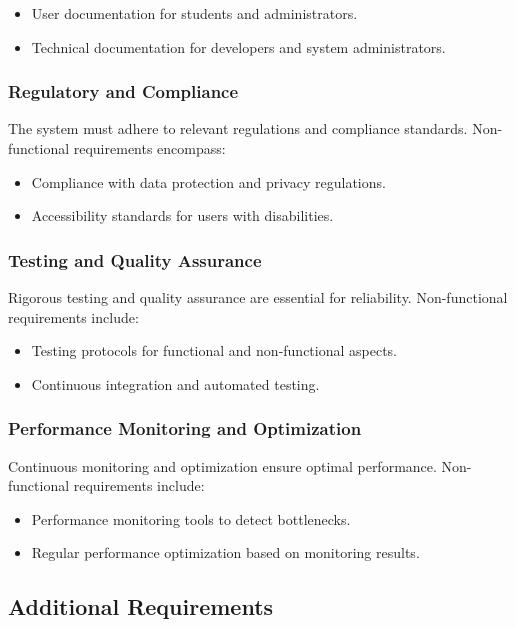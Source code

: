 \documentclass{article}
\begin{document}
\begin{itemize}
    \item User documentation for students and administrators.
    \item Technical documentation for developers and system administrators.
\end{itemize}

\subsubsection{Regulatory and Compliance}
The system must adhere to relevant regulations and compliance standards. Non-functional requirements encompass:

\begin{itemize}
    \item Compliance with data protection and privacy regulations.
    \item Accessibility standards for users with disabilities.
\end{itemize}

\subsubsection{Testing and Quality Assurance}
Rigorous testing and quality assurance are essential for reliability. Non-functional requirements include:

\begin{itemize}
    \item Testing protocols for functional and non-functional aspects.
    \item Continuous integration and automated testing.
\end{itemize}

\subsubsection{Performance Monitoring and Optimization}
Continuous monitoring and optimization ensure optimal performance. Non-functional requirements include:

\begin{itemize}
    \item Performance monitoring tools to detect bottlenecks.
    \item Regular performance optimization based on monitoring results.
\end{itemize}

\subsection{Additional Requirements}
\end{document}
